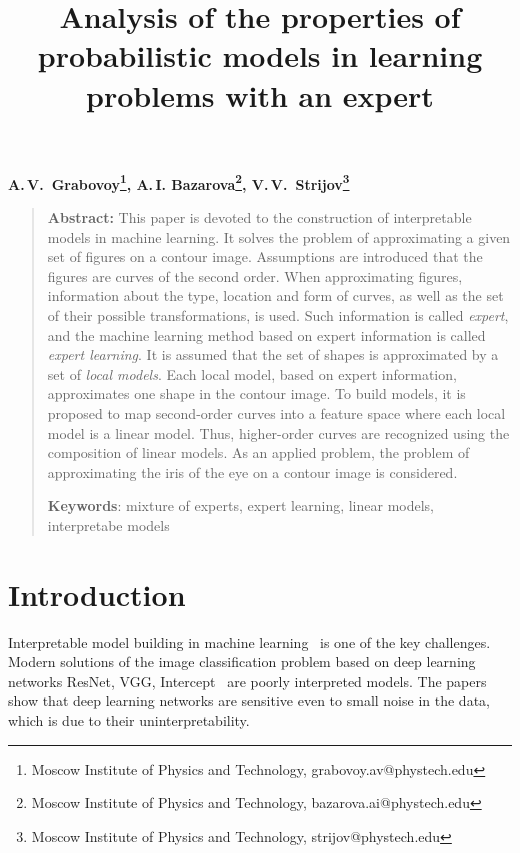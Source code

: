 \documentclass[12pt, twoside]{article}
\numberwithin{equation}{section}
\begin{document}
\title{\bf Analysis of the properties of probabilistic models in learning problems with an expert}
\date{}
\author{}
\maketitle



\begin{center}
\bf
A.\,V.~Grabovoy\footnote{Moscow Institute of Physics and Technology, grabovoy.av@phystech.edu}, 
A.\,I. Bazarova\footnote{Moscow Institute of Physics and Technology, bazarova.ai@phystech.edu}, 
V.\,V.~Strijov\footnote{Moscow Institute of Physics and Technology, strijov@phystech.edu}

\end{center}
{\centering\begin{quote}
\textbf{Abstract:} This paper is devoted to the construction of interpretable models in machine learning. 
It solves the problem of approximating a given set of figures on a contour image.
Assumptions are introduced that the figures are curves of the second order.
When approximating figures, information about the type, location and form of curves, as well as the set of their possible transformations, is used.
Such information is called \textit{expert}, and the machine learning method based on expert information is called \textit {expert learning}.
It is assumed that the set of shapes is approximated by a set of \textit {local models}.
Each local model, based on expert information, approximates one shape in the contour image.
To build models, it is proposed to map second-order curves into a feature space where each local model is a linear model.
Thus, higher-order curves are recognized using the composition of linear models.
As an applied problem, the problem of approximating the iris of the eye on a contour image is considered.
    

    
\smallskip
\textbf{Keywords}: mixture of experts, expert learning, linear models, interpretabe models
\smallskip
\end{quote}
}

\section {Introduction}
Interpretable model building in machine learning~\cite{Ribeiro2016} is one of the key challenges.
Modern solutions of the image classification problem based on deep learning networks ResNet, VGG, Intercept~\cite{Kaiming2015} are poorly interpreted models.
The papers~\cite{Han2020, Xingjun2019, Akhtar2018} show that deep learning networks are sensitive even to small noise in the data, which is due to their uninterpretability.
\end{document}
